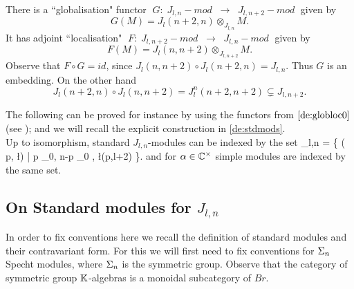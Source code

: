 \mdef  \label{de:globloc0}
There is a ``globalisation" functor 
$\; G:\; J_{l,n}-mod \;\; \rightarrow\;\; J_{l,n+2}-mod \;$ given by 
\[ G(M)=J_l(n+2,n)\otimes_{J_{l,n}} M.\]
It has adjoint ``localisation" $\; F:\; J_{l,n+2}-mod \;\; \rightarrow\;\; J_{l,n}-mod \;$ given by
\[ F(M)=J_l(n,n+2)\otimes_{J_{l,n+2}} M.\]
Observe that $F\circ G=id$, since $J_l(n,n+2)\circ J_l(n+2,n)=J_{l,n}$. 
Thus $G$ is an embedding. 
On the other hand 
$$
J_l(n+2,n)\circ J_l(n,n+2)=J_l^n(n+2,n+2)\subsetneq J_{l,n+2}  .
$$

\mdef \label{de:labelset} 
The following can be proved for instance by using the functors from $\ref{de:globloc0}$ 
(see \cite{KadarYu}); and we will recall the explicit construction in \ref{de:stdmods}. 
\\
Up to isomorphism,  %
standard  %
$J_{l,n}$-modules can be indexed by the set
\beq
\Lambda_{l,n} = \{  ( p, \l)\; | \; p \in \N_0, \; 
n-p \N_0 ,  %
\; \l\vdash   \min(p,l+2) \}.\label{eq:simples}
\eq
and for $\alpha \in \mathbb{C}^\times$ simple modules are indexed by the same set. 


%



\subsection{On Standard modules for $J_{l,n}$ %
}
\label{ss:sdmods}




In order to fix conventions here we recall the definition of standard modules and their contravariant form. 
For this we will first need to fix conventions for $\Sigma_n$ Specht modules, where $\Sigma_n$ is the symmetric group. 
Observe that the category of symmetric group $\mathbb{K}$-algebras is a monoidal subcategory of $Br$. 

